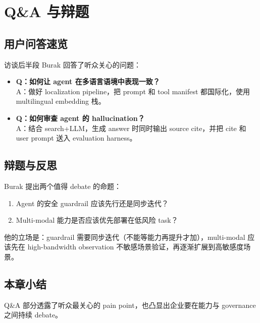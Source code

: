 \section{Q\&A 与辩题}

\subsection{用户问答速览}

访谈后半段 Burak 回答了听众关心的问题：

\begin{itemize}
    \item \textbf{Q：如何让 agent 在多语言语境中表现一致？}\\
    A：做好 localization pipeline，把 prompt 和 tool manifest 都国际化，使用 multilingual embedding 栈。
    \item \textbf{Q：如何审查 agent 的 hallucination？}\\
    A：结合 search+LLM，生成 answer 时同时输出 source cite，并把 cite 和 user prompt 送入 evaluation harness。
\end{itemize}

\subsection{辩题与反思}

Burak 提出两个值得 debate 的命题：

\begin{enumerate}
    \item Agent 的安全 guardrail 应该先行还是同步迭代？
    \item Multi-modal 能力是否应该优先部署在低风险 task？
\end{enumerate}

他的立场是：guardrail 需要同步迭代（不能等能力再提升才加），multi-modal 应该先在 high-bandwidth observation 不敏感场景验证，再逐渐扩展到高敏感度场景。

\subsection{本章小结}

Q\&A 部分透露了听众最关心的 pain point，也凸显出企业要在能力与 governance 之间持续 debate。

